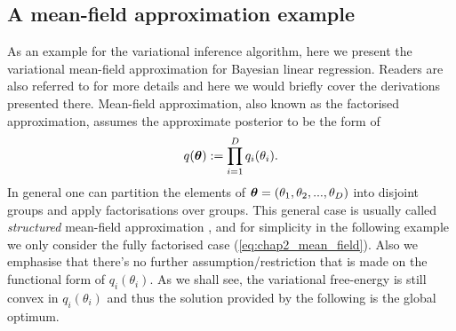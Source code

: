 \subsection{A mean-field approximation example}
\label{sec:chap2_mean_field_vi}
As an example for the variational inference algorithm, here we present the variational mean-field approximation \citep{parisi:book1988} for Bayesian linear regression. Readers are also referred to \citet{bishop:prml2006} for more details and here we would briefly cover the derivations presented there. Mean-field approximation, also known as the factorised approximation, assumes the approximate posterior to be the form of
\begin{equation}
q(\bm{\theta}) := \prod_{i=1}^{D} q_i(\theta_i).
\label{eq:chap2_mean_field}
\end{equation}
In general one can partition the elements of $\bm{\theta} = (\theta_1, \theta_2, ..., \theta_D)$ into disjoint groups and apply factorisations over groups. This general case is usually called \emph{structured} mean-field approximation \citep{saul:structured1996}, and for simplicity in the following example we only consider the fully factorised case (\ref{eq:chap2_mean_field}). Also we emphasise that there's no further assumption/restriction that is made on the functional form of $q_i(\theta_i)$. As we shall see, the variational free-energy is still convex in $q_i(\theta_i)$ and thus the solution provided by the following is the global optimum.

